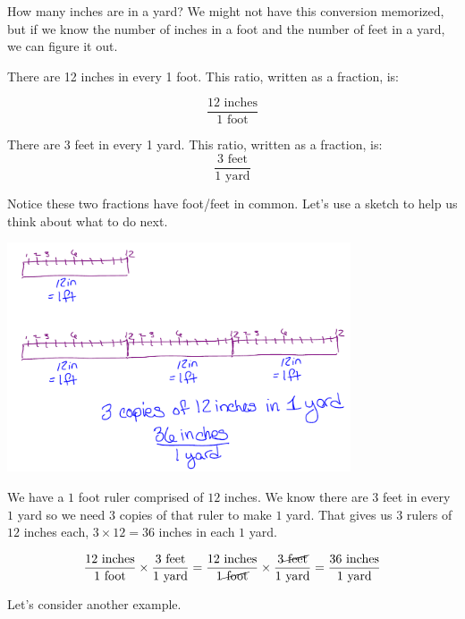 \documentclass{ximera}
\begin{document}
\begin{example} How many inches are in a yard? We might not have this conversion memorized, but if we know the number of inches in a foot and the number of feet in a yard, we can figure it out.

\begin{explanation}
There are 12 inches in every 1 foot. This ratio, written as a fraction, is: 

$$\frac{12 \text{ inches}}{1 \text{ foot}}$$

There are 3 feet in every 1 yard. This ratio, written as a fraction, is:
$$  \frac{3 \text{ feet}}{1 \text{ yard}} $$

Notice these two fractions have foot/feet in common. Let's use a sketch to help us think about what to do next.

\begin{image}
    \includegraphics[width=4in]{inchestoyard.png}
\end{image}

We have a $1$ foot ruler comprised of $12$ inches. We know there are $3$ feet in every $1$ yard so we need $3$ copies of that ruler to make $1$ yard. That gives us $3$ rulers of $12$ inches each, $3 \times 12=36$ inches in each $1$ yard.


$$
\frac{12 \text{ inches}}{1 \text{ foot}} \times \frac{3 \text{ feet}}{1 \text{ yard}} = \frac{12 \text{ inches}}{1 \cancel{\text{ foot}}} \times \frac{3  \cancel{\text{ feet}}}{1 \text{ yard}} = \frac{36 \text{ inches}}{1 \text{ yard}}
$$

\end{explanation}
\end{example}

Let's consider another example. 
\end{document}
